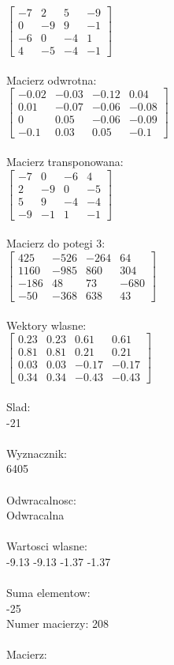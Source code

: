 \documentclass[a4paper,12pt]{article}
\begin{document}
$\begin{bmatrix} -7&2&5&-9\\0&-9&9&-1\\-6&0&-4&1\\4&-5&-4&-1 \end{bmatrix}$
\\
\\
Macierz odwrotna:\\

$\begin{bmatrix} -0.02&-0.03&-0.12&0.04\\0.01&-0.07&-0.06&-0.08\\0&0.05&-0.06&-0.09\\-0.1&0.03&0.05&-0.1 \end{bmatrix}$
\\
\\
Macierz transponowana:\\

$\begin{bmatrix} -7&0&-6&4\\2&-9&0&-5\\5&9&-4&-4\\-9&-1&1&-1 \end{bmatrix}$
\\
\\
Macierz do potegi 3:\\

$\begin{bmatrix} 425&-526&-264&64\\1160&-985&860&304\\-186&48&73&-680\\-50&-368&638&43 \end{bmatrix}$
\\
\\
Wektory wlasne:\\

$\begin{bmatrix} 0.23&0.23&0.61&0.61\\0.81&0.81&0.21&0.21\\0.03&0.03&-0.17&-0.17\\0.34&0.34&-0.43&-0.43 \end{bmatrix}$
\\
\\
Slad:\\
-21
\\
\\
Wyznacznik:\\
6405
\\
\\
Odwracalnosc:\\
Odwracalna
\\
\\
Wartosci wlasne:\\
-9.13 -9.13 -1.37 -1.37
\\
\\
Suma elementow:\\
-25
\\
\newpage
Numer macierzy:
208
\\
\\
Macierz:\\
\end{document}
